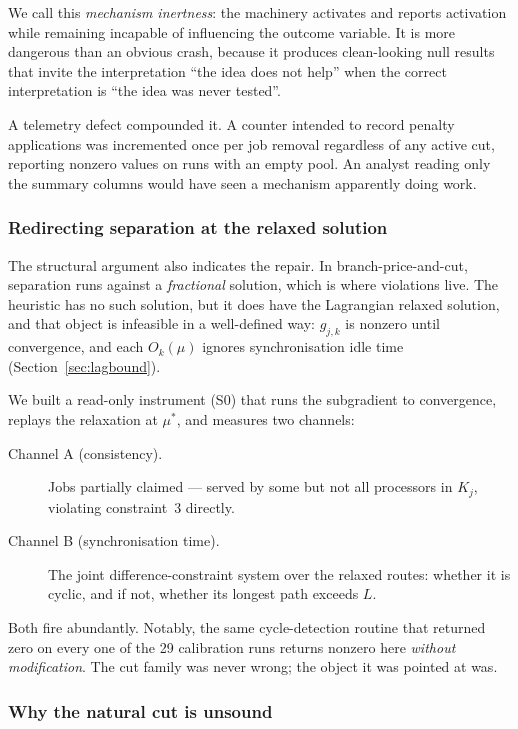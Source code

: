 \documentclass[11pt,a4paper]{article}
\newcommand{\Kj}{\ensuremath{K_j}}
\begin{document}
We call this \emph{mechanism inertness}: the machinery activates and reports
activation while remaining incapable of influencing the outcome variable. It is
more dangerous than an obvious crash, because it produces clean-looking null
results that invite the interpretation ``the idea does not help'' when the correct
interpretation is ``the idea was never tested''.

A telemetry defect compounded it. A counter intended to record penalty
applications was incremented once per job removal regardless of any active cut,
reporting nonzero values on runs with an empty pool. An analyst reading only the
summary columns would have seen a mechanism apparently doing work.

\subsubsection{Redirecting separation at the relaxed solution}\label{sec:s0}

The structural argument also indicates the repair. In branch-price-and-cut,
separation runs against a \emph{fractional} solution, which is where violations
live. The heuristic has no such solution, but it does have the Lagrangian relaxed
solution, and that object is infeasible in a well-defined way: $g_{j,k}$ is
nonzero until convergence, and each $O_k(\mu)$ ignores synchronisation idle time
(Section~\ref{sec:lagbound}).

We built a read-only instrument (S0) that runs the subgradient to convergence,
replays the relaxation at $\mu^\ast$, and measures two channels:

\begin{description}
  \item[Channel A (consistency).] Jobs partially claimed --- served by some but not
    all processors in $\Kj$, violating constraint~3 directly.
  \item[Channel B (synchronisation time).] The joint difference-constraint system
    over the relaxed routes: whether it is cyclic, and if not, whether its longest
    path exceeds $L$.
\end{description}

Both fire abundantly. Notably, the same cycle-detection routine that returned zero
on every one of the 29 calibration runs returns nonzero here \emph{without
modification}. The cut family was never wrong; the object it was pointed at was.



\subsubsection{Why the natural cut is unsound}\label{sec:s0b}
\end{document}
